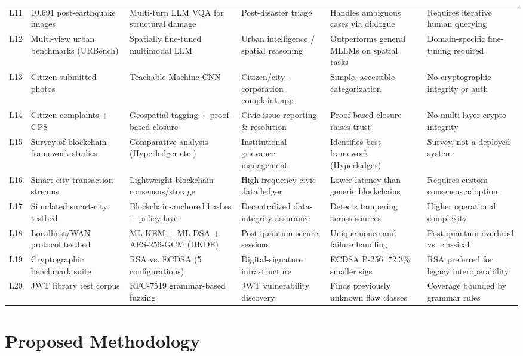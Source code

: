 \documentclass[conference]{IEEEtran}
\begin{document}
\begin{table}[t]
\begin{tabular}{p{}p{}p{}p{}p{}p{}}
L11 & 10{,}691 post-earthquake images & Multi-turn LLM VQA for structural damage & Post-disaster triage & Handles ambiguous cases via dialogue & Requires iterative human querying \\
L12 & Multi-view urban benchmarks (URBench) & Spatially fine-tuned multimodal LLM & Urban intelligence / spatial reasoning & Outperforms general MLLMs on spatial tasks & Domain-specific fine-tuning required \\
L13 & Citizen-submitted photos & Teachable-Machine CNN & Citizen/city-corporation complaint app & Simple, accessible categorization & No cryptographic integrity or auth \\
L14 & Citizen complaints + GPS & Geospatial tagging + proof-based closure & Civic issue reporting \& resolution & Proof-based closure raises trust & No multi-layer crypto integrity \\
L15 & Survey of blockchain-framework studies & Comparative analysis (Hyperledger etc.) & Institutional grievance management & Identifies best framework (Hyperledger) & Survey, not a deployed system \\
L16 & Smart-city transaction streams & Lightweight blockchain consensus/storage & High-frequency civic data ledger & Lower latency than generic blockchains & Requires custom consensus adoption \\
L17 & Simulated smart-city testbed & Blockchain-anchored hashes + policy layer & Decentralized data-integrity assurance & Detects tampering across sources & Higher operational complexity \\
L18 & Localhost/WAN protocol testbed & ML-KEM + ML-DSA + AES-256-GCM (HKDF) & Post-quantum secure sessions & Unique-nonce and failure handling & Post-quantum overhead vs. classical \\
L19 & Cryptographic benchmark suite & RSA vs. ECDSA (5 configurations) & Digital-signature infrastructure & ECDSA P-256: 72.3\% smaller sigs & RSA preferred for legacy interoperability \\
L20 & JWT library test corpus & RFC-7519 grammar-based fuzzing & JWT vulnerability discovery & Finds previously unknown flaw classes & Coverage bounded by grammar rules \\
\bottomrule
\end{tabular}
\end{table}

\section{Proposed Methodology}
\label{sec:methodology}
\end{document}
